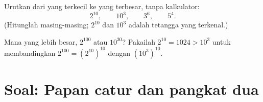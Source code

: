 \begin{exercise}[$\star\star$]\label{exo:g8:powers:10}
Urutkan dari yang terkecil ke yang terbesar, tanpa kalkulator:
\[
2^{10}, \qquad 10^3, \qquad 3^6, \qquad 5^4 .
\]
(Hitunglah masing-masing; $2^{10}$ dan $10^3$ adalah tetangga yang terkenal.)
\end{exercise}

\begin{exercise}[$\star\star\star$]\label{exo:g8:powers:11}
Mana yang lebih besar, $2^{100}$ atau $10^{30}$? Pakailah
$2^{10} = 1024 > 10^3$ untuk membandingkan
$2^{100} = \left(2^{10}\right)^{10}$ dengan
$\left(10^3\right)^{10}$.
\end{exercise}

\section{Soal: Papan catur dan pangkat dua}

